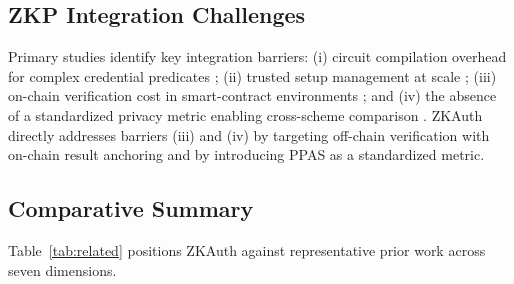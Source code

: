 \documentclass[journal,12pt,onecolumn]{IEEEtran}
\begin{document}
\subsection{ZKP Integration Challenges}

Primary studies identify key integration barriers: (i) circuit
compilation overhead for complex credential predicates
\cite{setty2020spartan}; (ii) trusted setup management at scale
\cite{gabizon2019plonk}; (iii) on-chain verification cost in
smart-contract environments \cite{wahby2019full}; and (iv) the absence
of a standardized privacy metric enabling cross-scheme comparison
\cite{cheng2024correlation,perez2023anonymous}. ZKAuth directly
addresses barriers (iii) and (iv) by targeting off-chain verification
with on-chain result anchoring and by introducing PPAS as a standardized
metric.

\subsection{Comparative Summary}

Table~\ref{tab:related} positions ZKAuth against representative prior
work across seven dimensions.
\end{document}
